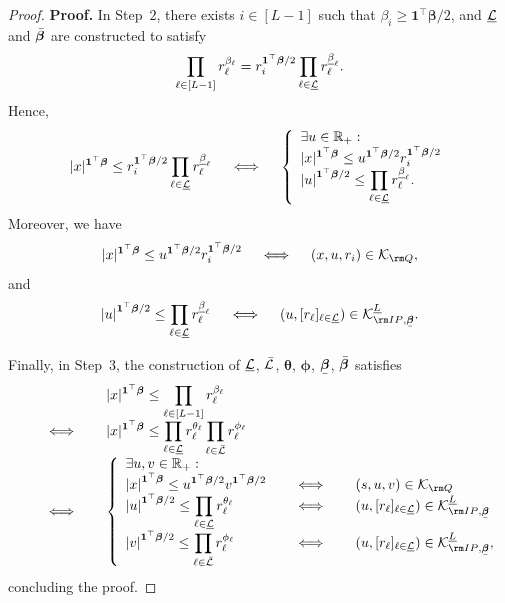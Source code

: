 \documentclass[opre, nonblindrev]{informswp}
\newcommand{\1}[1]{\mathds{1}{\left(#1\right)}}
\begin{document}
\begin{appendices}
\begin{proof}{\bf Proof.}
In Step~$2$, there exists $i \in [L-1]$ such that $\beta_i \geq \bm 1^\top \bm \beta/2$, and $\underline {\mathcal{L}}$ and $\bar{\bm{\beta}}$ are constructed to satisfy 
$$
\prod_{\ell \in [L-1]} r^{\beta_\ell}_\ell  = r_i^{\bm 1^\top \bm \beta/2}\prod_{\ell \in \underline {\mathcal{L}}} r^{\underline \beta_\ell}_\ell.
$$
Hence,
$$
|x|^{\bm 1^\top \bm \beta} \leq r_i^{\bm 1^\top \bm \beta/2}\prod_{\ell \in \underline {\mathcal{L}}} r^{\underline \beta_\ell}_\ell 
~~~\iff~~~
\left\{
\begin{array}{l}
\exists u \in \mathbb{R}_+:\\
\displaystyle |x|^{\bm 1^\top \bm \beta} \leq {u}^{\bm 1^\top \bm \beta/2} r_i^{\bm 1^\top \bm \beta/2}\\
\displaystyle {|u|}^{\bm 1^\top \bm \beta/2} \leq  \prod_{\ell \in \underline {\mathcal{L}}}r_\ell^{\underline \beta_\ell}.
\end{array}
\right.
$$
Moreover,  we have
$$
|x|^{\bm 1^\top \bm \beta} \leq {u}^{\bm 1^\top \bm \beta/2} r_i^{\bm 1^\top \bm \beta/2} 
~~~\iff~~~
(x,u,r_i) \in \cK_{\rm Q},
$$
and 
$$
{|u|}^{\bm 1^\top \bm \beta/2} \leq  \prod_{\ell \in \underline \cL}r_\ell^{\underline \beta_\ell} 
~~~\iff~~~
(u, [r_\ell]_{\ell \in \underline \cL}) \in \cK^{\underline L}_{{\rm IP},\bmu \beta}.
$$

Finally, in Step~$3$, the construction of $\underline {\mathcal{L}}$, $\bar {\mathcal{L}}$, $\bm \theta$, $\bm \phi$, $\bmu \beta$, $\bar{\bm{\beta}}$ satisfies
$$
\begin{array}{rcl}
&& \displaystyle |x|^{\bm 1^\top \bm \beta} \leq  \prod_{\ell \in [L-1]}r_\ell^{\beta_\ell} \\
&~~~\iff~~~& \displaystyle  
|x|^{\bm 1^\top \bm \beta}  \leq \prod_{\ell \in \underline \cL}r_\ell^{\theta_\ell}\prod_{\ell \in \bar \cL}r_\ell^{\phi_\ell}\\
&~~~\iff~~~&
\left\{
\begin{array}{lcl}
\exists u,v \in \bbr_+:\\
\displaystyle {|x|}^{\bm 1^\top \bm \beta} \leq {u}^{\bm 1^\top \bm \beta/2} {v}^{\bm 1^\top \bm \beta/2} &~~~\iff~~~& (s,u,v) \in \cK_{\rm Q}\\
\displaystyle {|u|}^{\bm 1^\top \bm \beta/2} \leq  \prod_{\ell \in \underline \cL}r_\ell^{\theta_\ell} &~~~\iff~~~& (u, [r_\ell]_{\ell \in \underline \cL}) \in \cK^{\underline L}_{{\rm IP},\bmu \beta} \\
\displaystyle  {|v|}^{\bm 1^\top \bm \beta/2} \leq  \prod_{\ell \in \bar \cL}r_\ell^{\phi_\ell} &~~~\iff~~~& (u, [r_\ell]_{\ell \in \underline \cL}) \in \cK^{\underline L}_{{\rm IP},\bmu \beta},
\end{array}\right.
\end{array}
$$
concluding the proof.
\hfill \Halmos
\end{proof}


\end{appendices}
\end{document}

